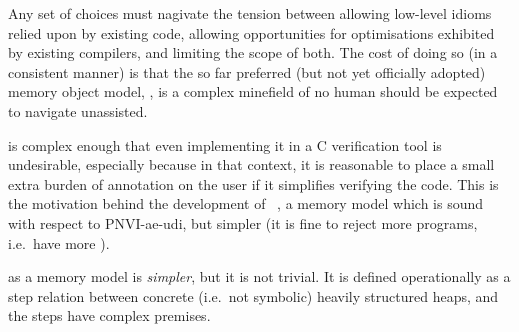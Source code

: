 Any set of choices must nagivate the tension between allowing
low-level idioms relied upon by existing code, allowing opportunities for
optimisations exhibited by existing compilers, and limiting the scope of both.
The cost of doing so (in a consistent manner) is that the so far preferred (but
not yet officially adopted) memory object model,
, is a
complex minefield of  no human should be expected to navigate
unassisted.

 is complex enough that even implementing it in a C
verification tool is undesirable, especially because in that context, it is
reasonable to place a small extra burden of annotation on the user if it
simplifies verifying the code. This is the motivation behind the development of
~, a memory model which is sound with respect
to PNVI-ae-udi, but simpler (it is fine to reject more programs, i.e.\
have more ).

 as a memory model is \emph{simpler}, but it is not trivial. It is
defined operationally as a step relation between concrete (i.e.\ not symbolic)
heavily structured heaps, and the steps have complex premises.

